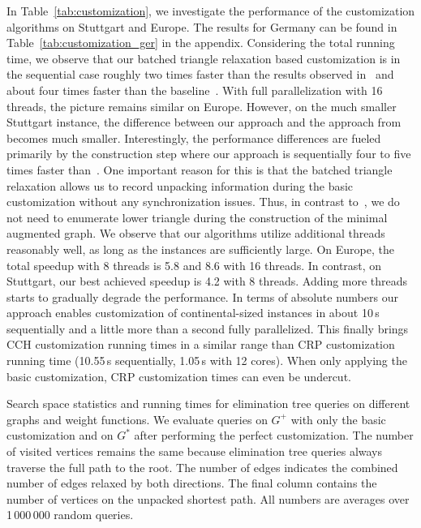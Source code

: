 \documentclass[a4paper, english, cleveref]{lipics-v2021}
\begin{document}
In Table~\ref{tab:customization}, we investigate the performance of the customization algorithms on Stuttgart and Europe.
The results for Germany can be found in Table~\ref{tab:customization_ger} in the appendix.
Considering the total running time, we observe that our batched triangle relaxation based customization is in the sequential case roughly two times faster than the results observed in~\cite{BuchholdSW19} and about four times faster than the baseline~\cite{DibbeltSW16}.
With full parallelization with 16 threads, the picture remains similar on Europe.
However, on the much smaller Stuttgart instance, the difference between our approach and the approach from~\cite{BuchholdSW19} becomes much smaller.
Interestingly, the performance differences are fueled primarily by the construction step where our approach is sequentially four to five times faster than~\cite{BuchholdSW19}.
One important reason for this is that the batched triangle relaxation allows us to record unpacking information during the basic customization without any synchronization issues.
Thus, in contrast to~\cite{BuchholdSW19}, we do not need to enumerate lower triangle during the construction of the minimal augmented graph.
We observe that our algorithms utilize additional threads reasonably well, as long as the instances are sufficiently large.
On Europe, the total speedup with 8 threads is 5.8 and 8.6 with 16 threads.
In contrast, on Stuttgart, our best achieved speedup is 4.2 with 8 threads.
Adding more threads starts to gradually degrade the performance.
In terms of absolute numbers our approach enables customization of continental-sized instances in about 10\,s sequentially and a little more than a second fully parallelized.
This finally brings CCH customization running times in a similar range than CRP customization running time (10.55\,s sequentially, 1.05\,s with 12 cores).
When only applying the basic customization, CRP customization times can even be undercut.

\begin{table}
\centering
\setlength{\tabcolsep}{4pt}
\caption{
Search space statistics and running times for elimination tree queries on different graphs and weight functions.
We evaluate queries on $G^+$ with only the basic customization and on $G^*$ after performing the perfect customization.
The number of visited vertices remains the same because elimination tree queries always traverse the full path to the root.
The number of edges indicates the combined number of edges relaxed by both directions.
The final column contains the number of vertices on the unpacked shortest path.
All numbers are averages over 1\,000\,000 random queries.
}\label{tab:queries}

\end{table}
\end{document}
